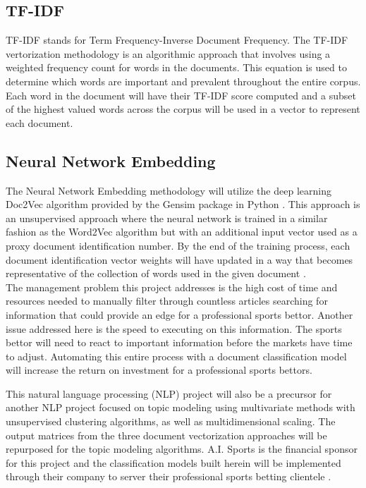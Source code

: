 \documentclass[5p,authoryear]{elsarticle}
\begin{document}
\subsection{TF-IDF}

TF-IDF stands for Term Frequency-Inverse Document Frequency. 
The TF-IDF vertorization methodology is an algorithmic approach that involves using a weighted frequency count for words in the documents.
This equation is used to determine which words are important and prevalent throughout the entire corpus. 
Each word in the document will have their TF-IDF score computed and a subset of the highest valued words across the corpus will be used in a vector to represent each document.


\subsection{Neural Network Embedding}

The Neural Network Embedding methodology will utilize the deep learning Doc2Vec algorithm provided by the Gensim package in Python \citep{gensim}. 
This approach is an unsupervised approach where the neural network is trained in a similar fashion as the Word2Vec algorithm but with an additional input vector used as a proxy document identification number. 
By the end of the training process, each document identification vector weights will have updated in a way that becomes representative of the collection of words used in the given document \citep{doc2vec}. \\


The management problem this project addresses is the high cost of time and resources needed to manually filter through countless articles searching for information that could provide an edge for a professional sports bettor. 
Another issue addressed here is the speed to executing on this information. 
The sports bettor will need to react to important information before the markets have time to adjust. 
Automating this entire process with a document classification model will increase the return on investment for a professional sports bettors.

This natural language processing (NLP) project will also be a precursor for another NLP project focused on topic modeling using multivariate methods with unsupervised clustering algorithms, as well as multidimensional scaling. 
The output matrices from the three document vectorization approaches will be repurposed for the topic modeling algorithms.
A.I. Sports is the financial sponsor for this project and the classification models built herein will be implemented through their company to server their professional sports betting clientele \citep{aisports}. 
\end{document}
